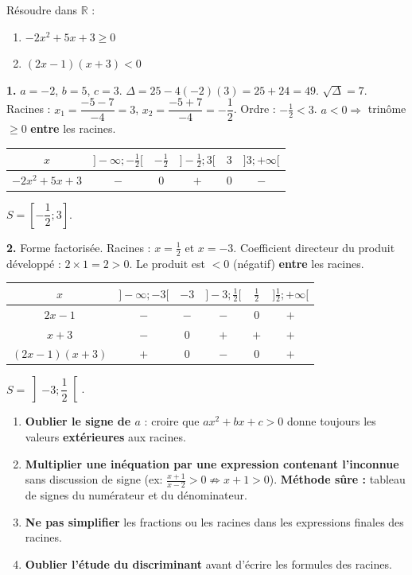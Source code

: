 \documentclass[11pt]{article}
\begin{document}
\begin{exoresolu}
Résoudre dans $\mathbb{R}$ :
\begin{enumerate}
  \item $-2x^2 + 5x + 3 \ge 0$
  \item $(2x-1)(x+3) < 0$
\end{enumerate}
\tcblower
\textbf{1.} $a=-2$, $b=5$, $c=3$. $\Delta = 25 - 4(-2)(3) = 25 + 24 = 49$. $\sqrt{\Delta}=7$.
Racines : $x_1 = \dfrac{-5 - 7}{-4} = 3$, $x_2 = \dfrac{-5 + 7}{-4} = -\dfrac{1}{2}$.
Ordre : $-\frac{1}{2} < 3$. $a < 0 \Rightarrow$ trinôme $\ge 0$ \textbf{entre} les racines.
\begin{center}
\begin{tabular}{|c|ccccc|}\hline
$x$ & $]-\infty; -\frac{1}{2}[$ & $-\frac{1}{2}$ & $]-\frac{1}{2}; 3[$ & $3$ & $]3; +\infty[$ \\ \hline
$-2x^2+5x+3$ & $-$ & $0$ & $+$ & $0$ & $-$ \\ \hline
\end{tabular}
\end{center}
$S = \left[ -\dfrac{1}{2} ; 3 \right]$.

\textbf{2.} Forme factorisée. Racines : $x = \frac{1}{2}$ et $x = -3$. Coefficient directeur du produit développé : $2 \times 1 = 2 > 0$.
Le produit est $< 0$ (négatif) \textbf{entre} les racines.
\begin{center}
\begin{tabular}{|c|ccccc|}\hline
$x$ & $]-\infty; -3[$ & $-3$ & $]-3; \frac{1}{2}[$ & $\frac{1}{2}$ & $]\frac{1}{2}; +\infty[$ \\ \hline
$2x-1$ & $-$ & $-$ & $-$ & $0$ & $+$ \\
$x+3$ & $-$ & $0$ & $+$ & $+$ & $+$ \\ \hline
$(2x-1)(x+3)$ & $+$ & $0$ & $-$ & $0$ & $+$ \\ \hline
\end{tabular}
\end{center}
$S = \left] -3 ; \dfrac{1}{2} \right[$.
\end{exoresolu}

\begin{attention}
\begin{enumerate}
\item \textbf{Oublier le signe de $a$} : croire que $ax^2+bx+c > 0$ donne toujours les valeurs \textbf{extérieures} aux racines.
\item \textbf{Multiplier une inéquation par une expression contenant l'inconnue} sans discussion de signe (ex: $\frac{x+1}{x-2} > 0 \not\Rightarrow x+1 > 0$). \textbf{Méthode sûre :} tableau de signes du numérateur et du dénominateur.
\item \textbf{Ne pas simplifier} les fractions ou les racines dans les expressions finales des racines.
\item \textbf{Oublier l'étude du discriminant} avant d'écrire les formules des racines.
\end{enumerate}
\end{attention}
\end{document}
